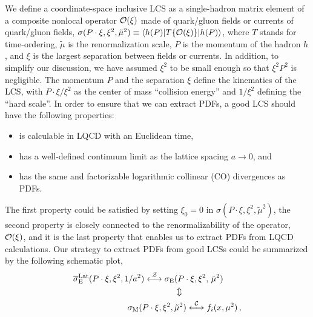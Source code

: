\documentclass[twocolumn,aps,prl,superscriptaddress,nofootinbib,showpacs]{revtex4-1}
\newcommand{\sect}[1]{\noindent{\it \textbf{#1} ---}}
\begin{document}
\sect{Lattice cross section (LCS)}
We define a coordinate-space inclusive LCS as a single-hadron matrix element of a composite nonlocal operator ${\cal O}(\xi)$ made of quark/gluon fields or currents of quark/gluon fields, $\sigma(P\cdot\xi,\xi^2, \tilde{\mu}^2)\equiv \langle h(P)|T\{{\cal O}(\xi)\}|h(P)\rangle$, where $T$ stands for time-ordering, $\tilde{\mu}$ is the renormalization scale, $P$ is the momentum of the hadron $h$, and $\xi$ is the largest separation between fields or currents. In addition, to simplify our discussion, we have assumed $\xi^2$ to be small enough so that $\xi^2 P^2$ is negligible.  The momentum $P$ and the separation $\xi$ define the kinematics of the LCS, with $P\cdot\xi/\xi^2$  as the center of mass ``collision energy'' and $1/\xi^2$ defining the ``hard scale''.
In order to ensure that we can extract PDFs, a good LCS should have the following properties:
\begin{itemize}
\item
is calculable in LQCD with an Euclidean time,
\item
has a well-defined continuum limit as the lattice spacing $a\to 0$, and
\item
has the same and factorizable logarithmic collinear (CO) divergences as PDFs.
\end{itemize}
The first property could be satisfied by setting $\xi_0=0$ in $\sigma( P\cdot\xi, \xi^2, \tilde{\mu}^2)$, the second property is closely connected to the renormalizability of the operator, ${\cal O}(\xi)$, and it is the last property that enables us to extract PDFs from LQCD calculations. Our strategy to extract PDFs from good LCSs could be summarized by the following schematic plot,
\begin{eqnarray}
\begin{split}
\overline{\sigma}_{\text{E}}^\text{Lat}(P\cdot\xi,\xi^2,1/a^2)
\overset{\cal Z}\longleftrightarrow
{\sigma}_{\text{E}}&(P\cdot\xi,\xi^2,\,\tilde{\mu}^2)
\label{eq:matching}\\
&\Updownarrow\\
{\sigma}_{\text{M}}(P\cdot\xi,\xi^2,\,&\tilde{\mu}^2)
\overset{\cal C}\longleftrightarrow
f_{i}(x,\mu^2)\, ,
\end{split}
\label{eq:matchings}
\end{eqnarray}
\end{document}
